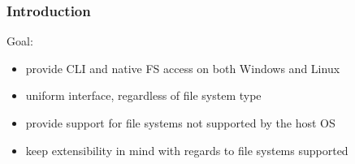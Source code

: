 

\begin{frame}

\frametitle{Introduction}
    \begin{block}{Goal:}
        \begin{itemize}
        \item provide CLI and native FS access on both Windows and Linux
        \item uniform interface, regardless of file system type
        \item provide support for file systems not supported by the host OS
        \item keep extensibility in mind with regards to file systems supported
        \end{itemize}
    \end{block}

\end{frame}